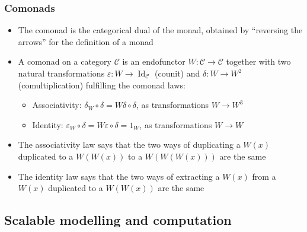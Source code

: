 \documentclass[mathserif,handout]{beamer}
\newcommand{\eps}{\varepsilon}
\begin{document}
\begin{frame}[fragile]
  \frametitle{Comonads}
  \begin{itemize}
    \item The comonad is the categorical dual of the monad, obtained by ``reversing the arrows'' for the definition of a monad
  \item A \alert{comonad} on a category $\mathcal{C}$ is an endofunctor $W: \mathcal{C}\longrightarrow\mathcal{C}$ together with two natural transformations $\eps: W \longrightarrow \operatorname{Id}_\mathcal{C}$ (\alert{counit}) and $\delta: W\longrightarrow W^2$ (\alert{comultiplication}) fulfilling the \alert{comonad laws}:
    \begin{itemize}
    \item \alert{Associativity}: $\delta_W \circ \delta = W\delta \circ \delta$, as transformations $W\longrightarrow W^3$
      \item \alert{Identity}: $\eps_W \circ \delta = W\eps \circ \delta = 1_W$, as transformations $W\longrightarrow W$
    \end{itemize}
  \item The associativity law says that the two ways of \alert{duplicating} a $W(x)$ duplicated to a $W(W(x))$ to a $W(W(W(x)))$ are the same
  \item The identity law says that the two ways of \alert{extracting} a $W(x)$ from a $W(x)$ duplicated to a $W(W(x))$ are the same
  \end{itemize}
\end{frame}

\subsection{Scalable modelling and computation}
\end{document}

